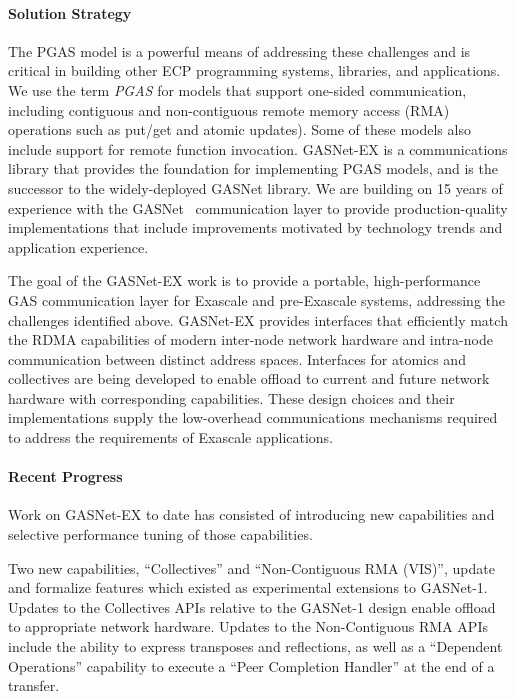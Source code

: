 \paragraph{Solution Strategy}

The PGAS model is a powerful means of addressing these
challenges and is critical in building other ECP programming systems,
libraries, and applications.  We use the term {\em PGAS} for models that support
one-sided communication, 
including contiguous and non-contiguous remote memory access (RMA) operations such as put/get
and atomic updates). Some of these models also include support for remote function invocation.
GASNet-EX is a communications library that provides the foundation for implementing
PGAS models, and is the successor to the widely-deployed GASNet library.
We are building on 15 years of experience with the GASNet~\cite{gasnet-spec,gasnet-site}
communication layer to provide production-quality implementations that include
improvements motivated by
technology trends and application experience.  

The goal of the GASNet-EX work is to provide a portable, high-performance GAS
communication layer for Exascale and pre-Exascale systems, addressing the challenges
identified above.
GASNet-EX provides interfaces that efficiently match the RDMA capabilities of modern
inter-node network hardware and intra-node communication between distinct address spaces.
Interfaces for atomics and collectives are being developed to enable offload to current
and future network hardware with corresponding capabilities.
These design choices and their implementations supply the low-overhead communications
mechanisms required to address the requirements of Exascale applications.


\paragraph{Recent Progress}

Work on GASNet-EX to date has consisted of introducing new capabilities and
selective performance tuning of those capabilities. 

Two new capabilities, ``Collectives'' and ``Non-Contiguous RMA
(VIS)'', update and formalize features which existed as experimental
extensions to GASNet-1.  Updates to the Collectives APIs relative to the
GASNet-1 design enable offload to appropriate network hardware.  Updates to the
Non-Contiguous RMA APIs include the ability to express transposes and
reflections, as well as a ``Dependent Operations'' capability to execute a
``Peer Completion Handler'' at the end of a transfer.

